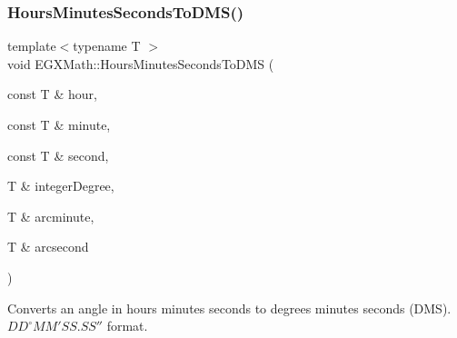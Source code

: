 \subsubsection{\texorpdfstring{Hours\+Minutes\+Seconds\+To\+D\+M\+S()}{HoursMinutesSecondsToDMS()}}
{\footnotesize\ttfamily template$<$typename T $>$ \\
void E\+G\+X\+Math\+::\+Hours\+Minutes\+Seconds\+To\+D\+MS (\begin{DoxyParamCaption}\item[{const T \&}]{hour,  }\item[{const T \&}]{minute,  }\item[{const T \&}]{second,  }\item[{T \&}]{integer\+Degree,  }\item[{T \&}]{arcminute,  }\item[{T \&}]{arcsecond }\end{DoxyParamCaption})}



Converts an angle in hours minutes seconds to degrees minutes seconds (D\+MS). ${DD}^{\circ}{MM}'{SS.SS}''$ format. 

